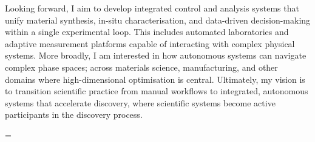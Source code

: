 \documentclass[10pt,a4paper,ragged2e,withhyper,paragraphstrue]{altacv}
\newcommand{\textalignment}{
	\justifying{}
    \tolerance=1 %
    \emergencystretch=\maxdimen{}
    \hyphenpenalty=10000 
    \hbadness=10000
}
\newcommand{\pind}{\hspace{24pt}}
\begin{document}
{    \pind{} Looking forward, I aim to develop integrated control and analysis systems that unify material synthesis, in-situ characterisation, and data-driven decision-making within a single experimental loop. This includes automated laboratories and adaptive measurement platforms capable of interacting with complex physical systems. More broadly, I am interested in how autonomous systems can navigate complex phase spaces; across materials science, manufacturing, and other domains where high-dimensional optimisation is central. Ultimately, my vision is to transition scientific practice from manual workflows to integrated, autonomous systems that accelerate discovery, where scientific systems become active participants in the discovery process.
    }

    {\color{emphasis}
    \textalignment{}

    }
    
    \divider{}

\end{document}
